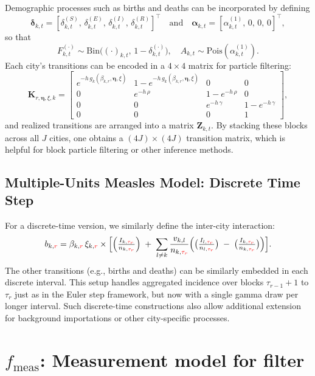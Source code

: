 \documentclass{article}
\newcommand\fmeas{f_{\mathrm{meas}}}
\begin{document}
Demographic processes such as births and deaths can be incorporated by defining
\[
\boldsymbol{\delta}_{k,t} 
= 
[\delta_{k,t}^{(S)},\,\delta_{k,t}^{(E)},\,\delta_{k,t}^{(I)},\,\delta_{k,t}^{(R)}]^\top 
\quad\text{and}\quad
\boldsymbol{\alpha}_{k,t}
= 
[\alpha_{k,t}^{(1)},\,0,\,0,\,0]^\top,
\]
so that
\[
F_{k,t}^{(\cdot)} 
\sim 
\mathrm{Bin}\bigl((\cdot)_{k,t},\,1 - \delta_{k,t}^{(\cdot)}\bigr),\quad
A_{k,t} 
\sim
\mathrm{Pois}(\alpha_{k,t}^{(1)}).
\]
Each city’s transitions can be encoded in a $4\times4$ matrix for particle filtering:
\[
\mathbf{K}_{r,\boldsymbol{\eta},\xi,k}
=
\begin{bmatrix}
e^{-h\,g_k(\beta_{k,r},\boldsymbol{\eta},\xi)} 
  & 1 - e^{-h\,g_k(\beta_{k,r},\boldsymbol{\eta},\xi)} 
  & 0 & 0\\
0 & e^{-h\,\rho} & 1 - e^{-h\,\rho} & 0\\
0 & 0 & e^{-h\,\gamma} & 1 - e^{-h\,\gamma}\\
0 & 0 & 0 & 1
\end{bmatrix},
\]
and realized transitions are arranged into a matrix $\mathbf{Z}_{k,t}$. By stacking these blocks across all $J$ cities, one obtains a $(4J)\times(4J)$ transition matrix, which is helpful for block particle filtering or other inference methods.

\subsection*{Multiple-Units Measles Model: Discrete Time Step}

For a discrete-time version, we similarly define the inter-city interaction:
\[
b_{k,\textcolor{red}{r}}
=
\beta_{k,\textcolor{red}{r}}\,\xi_{k,\textcolor{red}{r}}
\times
\Bigl[
  \Bigl(\tfrac{I_{k,\textcolor{red}{\tau_{r}}}}{n_{k,\textcolor{red}{\tau_{r}}}}\Bigr)
  \;+\; 
  \sum_{l \neq k} \frac{v_{k,l}}{n_{k,\textcolor{red}{\tau_{r}}}}\Bigl(
    \bigl(\tfrac{I_{l,\textcolor{red}{\tau_{r}}}}{n_{l,\textcolor{red}{\tau_{r}}}}\bigr)
    \;-\;
    \bigl(\tfrac{I_{k,\textcolor{red}{\tau_{r}}}}{n_{k,\textcolor{red}{\tau_{r}}}}\bigr)
  \Bigr)
\Bigr].
\]
The other transitions (e.g., births and deaths) can be similarly embedded in each discrete interval. This setup handles aggregated incidence over blocks $\tau_{r-1}+1$ to $\tau_r$ just as in the Euler step framework, but now with a single gamma draw per longer interval. Such discrete-time constructions also allow additional extension for background importations or other city-specific processes.

\section{\texorpdfstring{$\fmeas$}{fmeas}: Measurement model for filter}
\end{document}
